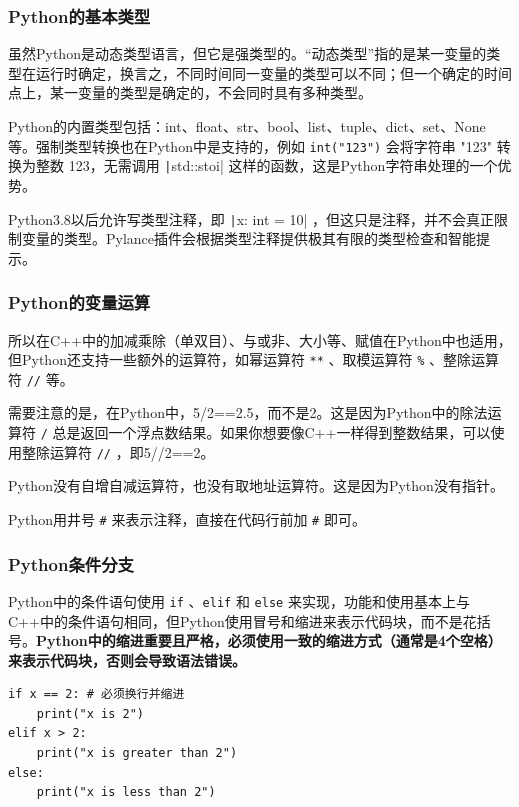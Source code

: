 \begin{frame}
    \frametitle{Python的基本类型}

    虽然Python是动态类型语言，但它是强类型的。“动态类型”指的是某一变量的类型在运行时确定，换言之，不同时间同一变量的类型可以不同；但一个确定的时间点上，某一变量的类型是确定的，不会同时具有多种类型。

    Python的内置类型包括：int、float、str、bool、list、tuple、dict、set、None等。强制类型转换也在Python中是支持的，例如 \texttt{int("123")} 会将字符串 "123" 转换为整数 123，无需调用 \texttt|std::stoi| 这样的函数，这是Python字符串处理的一个优势。
    
    Python3.8以后允许写类型注释，即 \texttt|x: int = 10| ，但这只是注释，并不会真正限制变量的类型。Pylance插件会根据类型注释提供极其有限的类型检查和智能提示。

\end{frame}

\begin{frame}[fragile]
    \frametitle{Python的变量运算}

    所以在C++中的加减乘除（单双目）、与或非、大小等、赋值在Python中也适用，但Python还支持一些额外的运算符，如幂运算符 \texttt{**} 、取模运算符 \verb|%| 、整除运算符 \texttt{//} 等。

    需要注意的是，在Python中，5/2==2.5，而不是2。这是因为Python中的除法运算符 \texttt{/} 总是返回一个浮点数结果。如果你想要像C++一样得到整数结果，可以使用整除运算符 \texttt{//} ，即5//2==2。

    Python没有自增自减运算符，也没有取地址运算符。这是因为Python没有指针。

    Python用井号 \texttt{\#} 来表示注释，直接在代码行前加 \texttt{\#} 即可。

\end{frame}

\begin{frame}[fragile]
    \frametitle{Python条件分支}

    Python中的条件语句使用 \texttt{if} 、\texttt{elif} 和 \texttt{else} 来实现，功能和使用基本上与C++中的条件语句相同，但Python使用冒号和缩进来表示代码块，而不是花括号。\textbf{Python中的缩进重要且严格，必须使用一致的缩进方式（通常是4个空格）来表示代码块，否则会导致语法错误。}

    \begin{verbatim}
if x == 2: # 必须换行并缩进
    print("x is 2")
elif x > 2:
    print("x is greater than 2")
else:
    print("x is less than 2")
    \end{verbatim}

\end{frame}

